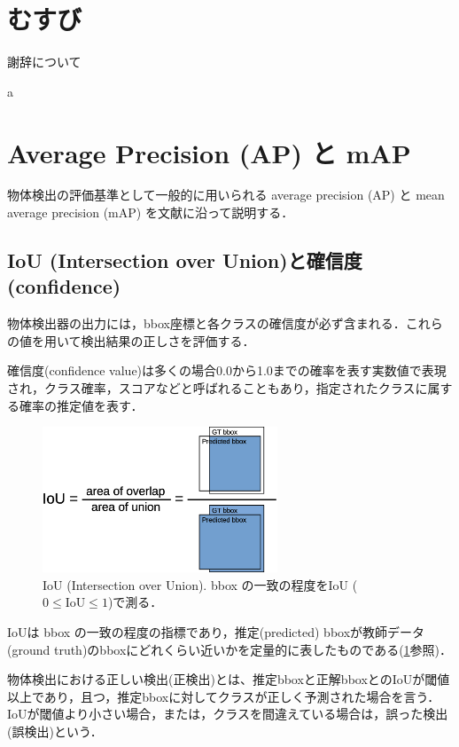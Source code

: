 \documentclass[originalpaper,fleqn]{jsaiart}     %
\begin{document}
\section{むすび}

\begin{acknowledgment}
謝辞について
\end{acknowledgment}a

%



\appendix

\section{Average Precision (AP) と mAP}
物体検出の評価基準として一般的に用いられる average precision (AP) と mean average precision (mAP) を文献\cite{PNS20}に沿って説明する．

\subsection{IoU (Intersection over Union)と確信度(confidence)}
物体検出器の出力には，bbox座標と各クラスの確信度が必ず含まれる．これらの値を用いて検出結果の正しさを評価する．

確信度(confidence value)は多くの場合0.0から1.0までの確率を表す実数値で表現され，クラス確率，スコアなどと呼ばれることもあり，指定されたクラスに属する確率の推定値を表す．

\begin{figure}[tb]
    \centering
    \includegraphics[width=7cm,clip]{fig/IoU.eps}
    \capwidth=70mm %
    \caption{ IoU (Intersection over Union). bbox の一致の程度をIoU ($0{\leq}\mbox{IoU}{\leq}1$)で測る．}
    \label{fig:IoU}
\end{figure}
IoUは bbox の一致の程度の指標であり，推定(predicted) bboxが教師データ(ground truth)のbboxにどれくらい近いかを定量的に表したものである(\ref{fig:IoU}参照)．

物体検出における正しい検出(正検出)とは、推定bboxと正解bboxとのIoUが閾値以上であり，且つ，推定bboxに対してクラスが正しく予測された場合を言う．
IoUが閾値より小さい場合，または，クラスを間違えている場合は，誤った検出(誤検出)という．
\end{document}
